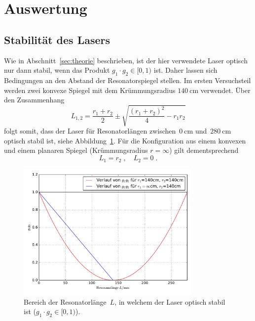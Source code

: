 \section{Auswertung}
\label{sec:auswertung}

%
\subsection{Stabilität des Lasers}
%
Wie in Abschnitt~\ref{sec:theorie} beschrieben, ist der hier verwendete Laser optisch nur dann stabil, wenn das Produkt $g_1\cdot g_2\in[0,1)$ ist. Daher lassen sich Bedingungen an den Abstand der Resonatorspiegel stellen. Im ersten Versuchsteil werden zwei konvexe Spiegel mit dem Krümmungsradius $\SI{140}{\centi\meter}$ verwendet. Über den Zusammenhang
%
\begin{equation}
  L_{1,2}=\frac{r_1+r_2}{2}\pm\sqrt{\frac{(r_1+r_2)^2}{4}-r_1r_2}
\end{equation}
%
folgt somit, dass der Laser für Resonatorlängen zwischen~$\SI{0}{\centi\meter}$ und~$\SI{280}{\centi\meter}$ optisch stabil ist, siehe
Abbildung~\ref{fig:opt_stab}. Für die Konfiguration aus einem konvexen und einem planaren Spiegel (Krümmungsradius $r=\infty$) gilt dementsprechend
%
\begin{equation}
  L_1=r_2\; , \quad L_2=0 \; .
\end{equation}

\begin{figure}[htb]
  \centering
  \includegraphics[width=0.8\textwidth]{auswertung/plot_laser_140_140.pdf}
  \caption{Bereich der Resonatorlänge~$L$, in welchem der Laser optisch stabil ist ($g_1\cdot g_2\in[0,1)$).}
  \label{fig:opt_stab}
\end{figure}

